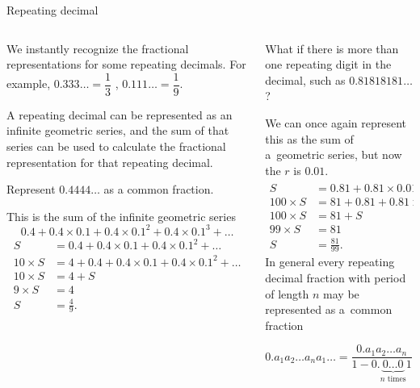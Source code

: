 \documentclass[9pt,aspectratio=169]{beamer}
\begin{document}
\begin{frame}{Repeating decimal}
  \begin{columns}[T]
    \begin{column}{0.5\textwidth}
      We instantly recognize the fractional representations for some repeating decimals.  For example, $0.333\ldots = \dfrac{1}{3}$ , $0.111\ldots = \dfrac{1}{9}$.  
      
      A repeating decimal can be represented as an infinite geometric series, and the sum of that series can be used to calculate the fractional representation for that repeating decimal.
      \begin{problem}
        Represent $0{.}4444\ldots$ as a common fraction.
      \end{problem}
      This is the sum of the infinite geometric series 
      \[0.4 + 0.4 \times 0.1 + 0.4 \times 0.1^2 + 0.4 \times 0.1^3 + \ldots \]\vspace*{-1\baselineskip}
      \begin{align*}
        S &= 0.4 + 0.4 \times 0.1 + 0.4 × 0.1^2 + \ldots \\
        10 \times S &= 4 + 0.4 + 0.4 × 0.1 + 0.4 × 0.1^2 + \ldots \\
        10 \times S &= 4 + S \\
        9 \times S &= 4 \\
        S &= \frac{4}{9}.
      \end{align*}
    \end{column}
    \begin{column}{0.5\textwidth}
      \begin{problem}
        What if there is more than one repeating digit in the decimal, such as $0.81818181\ldots$?  
      \end{problem}
      We can once again represent this as the sum of a~geometric series, but now the $r$ is $0.01$.
      \begin{align*}
        S &= 0.81 + 0.81 \times 0.01 + 0.81 \times 0.01^2 + \ldots \\
        100 \times S &= 81 + 0.81 + 0.81 \times 0.01 + \ldots \\
        100 \times S &= 81 + S \\
        99 \times S &= 81 \\
        S &= \frac{81}{99}.   
      \end{align*}
      In general every repeating decimal fraction with period of length $n$ may be represented as a~common fraction
      \begin{definition}
        \vspace*{-0.4em}
        \[ 0.a_1 a_2\ldots a_n a_1 \ldots = \frac{0.a_1 a_2\ldots a_n}{1 - 0.\underbrace{0\ldots0}_\text{$n$ times}1} = \frac{a_1 a_2\ldots a_n}{\underbrace{999\ldots 9}_\text{$n$ times}}. \]
        \vspace*{-0.4em}
      \end{definition}
    \end{column}
  \end{columns}
\end{frame}
\end{document}
